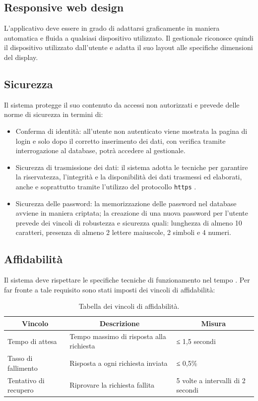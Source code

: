 \subsection{Responsive web design}
L'applicativo deve essere in grado di adattarsi graficamente in maniera automatica e fluida a qualsiasi dispositivo utilizzato. Il gestionale riconosce quindi il dispositivo utilizzato dall’utente e adatta il suo layout alle specifiche dimensioni del display.

\subsection{Sicurezza}
Il sistema protegge il suo contenuto da accessi non autorizzati e prevede delle norme di sicurezza in termini di:
\begin{itemize}
  \item Conferma di identità: all'utente non autenticato viene mostrata la pagina di login e solo dopo il corretto inserimento dei dati, con verifica tramite interrogazione al database, potrà accedere al gestionale. 
  \item Sicurezza di trasmissione dei dati: il sistema adotta le tecniche per garantire la riservatezza, l'integrità e la disponibilità dei dati trasmessi ed elaborati, anche e soprattutto tramite l'utilizzo del protocollo \texttt{https} \cite{https}.
  \item Sicurezza delle password: la memorizzazione delle password nel database avviene in maniera criptata; la creazione di una nuova password per l'utente prevede dei vincoli di robustezza e sicurezza quali: lunghezza di almeno 10 caratteri, presenza di almeno 2 lettere maiuscole, 2 simboli e 4 numeri.
\end{itemize}

\subsection{Affidabilità}
Il sistema deve rispettare le specifiche tecniche di funzionamento nel tempo \cite{affidabilita}.
Per far fronte a tale requisito sono stati imposti dei vincoli di affidabilità:

\begin{table}[h!]
\centering
\begin{tabular}{|l|l|l|}
\hline
\multicolumn{1}{|c|}{\textbf{Vincolo}} & \multicolumn{1}{c|}{\textbf{Descrizione}} & \multicolumn{1}{c|}{\textbf{Misura}} \\ \hline
Tempo di attesa                        & Tempo massimo di risposta alla richiesta  & ≤ 1,5 secondi                        \\ \hline
Tasso di fallimento                    & Risposta a ogni richiesta inviata         & ≤ 0,5\%                              \\ \hline
Tentativo di recupero                  & Riprovare la richiesta fallita            & 5 volte a intervalli di 2 secondi    \\ \hline
\end{tabular}
\caption{Tabella dei vincoli di affidabilità.}
\label{}
\end{table}

